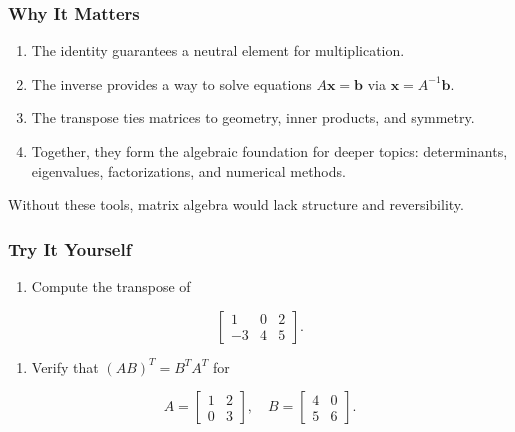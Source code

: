 \documentclass[
  letterpaper,
  DIV=11,
  numbers=noendperiod]{scrreprt}
\providecommand{\tightlist}{%
  \setlength{\itemsep}{0pt}\setlength{\parskip}{0pt}}
\begin{document}
\subsubsection{Why It Matters}\label{why-it-matters-12}

\begin{enumerate}
\def\labelenumi{\arabic{enumi}.}
\tightlist
\item
  The identity guarantees a neutral element for multiplication.
\item
  The inverse provides a way to solve equations
  \(A\mathbf{x} = \mathbf{b}\) via \(\mathbf{x} = A^{-1}\mathbf{b}\).
\item
  The transpose ties matrices to geometry, inner products, and symmetry.
\item
  Together, they form the algebraic foundation for deeper topics:
  determinants, eigenvalues, factorizations, and numerical methods.
\end{enumerate}

Without these tools, matrix algebra would lack structure and
reversibility.

\subsubsection{Try It Yourself}\label{try-it-yourself-15}

\begin{enumerate}
\def\labelenumi{\arabic{enumi}.}
\tightlist
\item
  Compute the transpose of
\end{enumerate}

\[
\begin{bmatrix} 
1 & 0 & 2 \\ 
-3 & 4 & 5 
\end{bmatrix}.
\]

\begin{enumerate}
\def\labelenumi{\arabic{enumi}.}
\setcounter{enumi}{1}
\tightlist
\item
  Verify that \((AB)^T = B^TA^T\) for
\end{enumerate}

\[
A = \begin{bmatrix} 1 & 2 \\ 0 & 3 \end{bmatrix}, \quad 
B = \begin{bmatrix} 4 & 0 \\ 5 & 6 \end{bmatrix}.
\]
\end{document}
